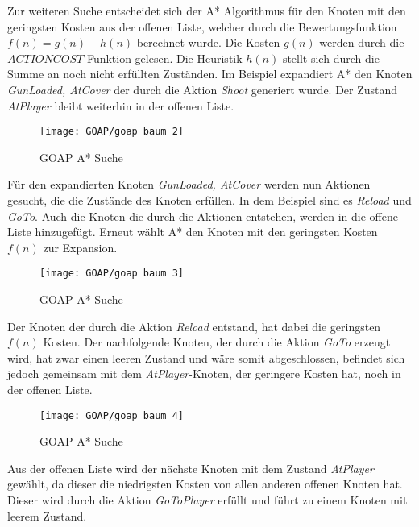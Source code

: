 Zur weiteren Suche entscheidet sich der A* Algorithmus f\"{u}r den Knoten mit den geringsten Kosten aus der offenen Liste, welcher durch die Bewertungsfunktion $f(n) = g(n) + h(n)$ berechnet wurde. Die Kosten $g(n)$ werden durch die $\textit{ACTIONCOST}$-Funktion gelesen. Die Heuristik $h(n)$ stellt sich durch die Summe an noch nicht erf\"{u}llten Zust\"{a}nden. Im Beispiel expandiert A* den Knoten \textit{GunLoaded, AtCover} der durch die Aktion \textit{Shoot} generiert wurde. Der Zustand \textit{AtPlayer} bleibt weiterhin in der offenen Liste.

\begin{figure}[h]
  \centering
  \texttt{[image: GOAP/goap baum 2]}
	\captionsetup{justification=justified, format=plain}
  \caption{GOAP A* Suche}
  \label{fig:goap2}
\end{figure}

F\"{u}r den expandierten Knoten \textit{GunLoaded, AtCover} werden nun Aktionen gesucht, die die Zust\"{a}nde des Knoten erf\"{u}llen. In dem Beispiel sind es \textit{Reload} und \textit{GoTo}. Auch die Knoten die durch die Aktionen entstehen, werden in die offene Liste hinzugef\"{u}gt. Erneut w\"{a}hlt A* den Knoten mit den geringsten Kosten $f(n)$ zur Expansion.
\clearpage

\begin{figure}[h]
  \centering
  \texttt{[image: GOAP/goap baum 3]}
	\captionsetup{justification=justified, format=plain}
  \caption{GOAP A* Suche}
  \label{fig:goap3}
\end{figure}

Der Knoten der durch die Aktion \textit{Reload} entstand, hat dabei die geringsten $f(n)$ Kosten. Der nachfolgende Knoten, der durch die Aktion \textit{GoTo} erzeugt wird, hat zwar einen leeren Zustand und w\"{a}re somit abgeschlossen, befindet sich jedoch gemeinsam mit dem \textit{AtPlayer}-Knoten, der geringere Kosten hat, noch in der offenen Liste.

\begin{figure}[h]
  \centering
  \texttt{[image: GOAP/goap baum 4]}
	\captionsetup{justification=justified, format=plain}
  \caption{GOAP A* Suche}
  \label{fig:goap4}
\end{figure}

Aus der offenen Liste wird der n\"{a}chste Knoten mit dem Zustand \textit{AtPlayer} gew\"{a}hlt, da dieser die niedrigsten Kosten von allen anderen offenen Knoten hat. Dieser wird durch die Aktion \textit{GoToPlayer} erf\"{u}llt und f\"{u}hrt zu einem Knoten mit leerem Zustand.

